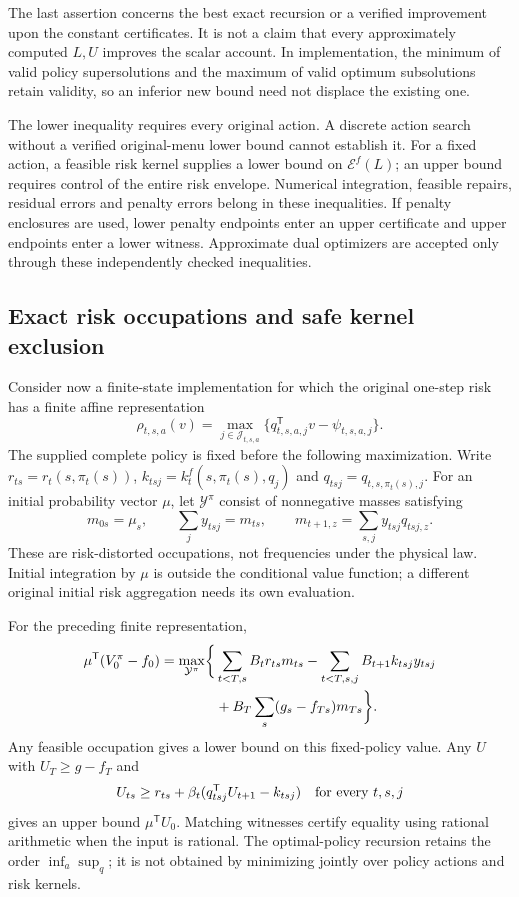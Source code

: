 The last assertion concerns the best exact recursion or a verified improvement upon the constant certificates. It is not a claim that every approximately computed $L,U$ improves the scalar account. In implementation, the minimum of valid policy supersolutions and the maximum of valid optimum subsolutions retain validity, so an inferior new bound need not displace the existing one.

The lower inequality requires every original action. A discrete action search without a verified original-menu lower bound cannot establish it. For a fixed action, a feasible risk kernel supplies a lower bound on $\mathcal E^f(L)$; an upper bound requires control of the entire risk envelope. Numerical integration, feasible repairs, residual errors and penalty errors belong in these inequalities. If penalty enclosures are used, lower penalty endpoints enter an upper certificate and upper endpoints enter a lower witness. Approximate dual optimizers are accepted only through these independently checked inequalities.

\subsection{Exact risk occupations and safe kernel exclusion}
Consider now a finite-state implementation for which the original one-step risk has a finite affine representation
\[
 \rho_{t,s,a}(v)=\max_{j\in\mathcal J_{t,s,a}}
       \{q_{t,s,a,j}^{\mathsf T}v-\psi_{t,s,a,j}\}.
\]
The supplied complete policy is fixed before the following maximization. Write $r_{ts}=r_t(s,\pi_t(s))$, $k_{tsj}=k_t^f(s,\pi_t(s),q_j)$ and $q_{tsj}=q_{t,s,\pi_t(s),j}$. For an initial probability vector $\mu$, let $\mathcal Y^\pi$ consist of nonnegative masses satisfying
\begin{equation}\label{eq:riskflow92}
 m_{0s}=\mu_s,\qquad \sum_j y_{tsj}=m_{ts},\qquad
 m_{t+1,z}=\sum_{s,j}y_{tsj}q_{tsj,z}.
\end{equation}
These are risk-distorted occupations, not frequencies under the physical law. Initial integration by $\mu$ is outside the conditional value function; a different original initial risk aggregation needs its own evaluation.

\begin{proposition}\label{prop:riskflow92}
For the preceding finite representation,
\begin{align}\label{eq:riskflow-value92}
 \mu^{\mathsf T}(V_0^\pi-f_0)
 =\max_{\mathcal Y^\pi}\biggl\{
 &\sum_{t<T,s}B_t r_{ts}m_{ts}
 -\sum_{t<T,s,j}B_{t+1}k_{tsj}y_{tsj}\notag\\
 &+B_T\sum_s(g_s-f_{Ts})m_{Ts}\biggr\}.
\end{align}
Any feasible occupation gives a lower bound on this fixed-policy value. Any $U$ with $U_T\ge g-f_T$ and
\[
 U_{ts}\ge r_{ts}+\beta_t(q_{tsj}^{\mathsf T}U_{t+1}-k_{tsj})
 \quad\hbox{for every }t,s,j
\]
gives an upper bound $\mu^{\mathsf T}U_0$. Matching witnesses certify equality using rational arithmetic when the input is rational. The optimal-policy recursion retains the order $\inf_a\sup_q$; it is not obtained by minimizing jointly over policy actions and risk kernels.
\end{proposition}

